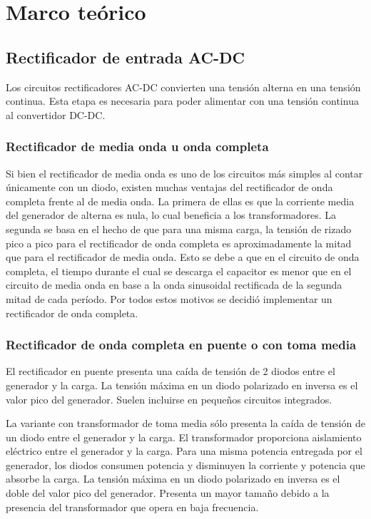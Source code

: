 \section{Marco teórico}




\subsection{Rectificador de entrada AC-DC}

Los circuitos rectificadores AC-DC convierten una tensión alterna en una tensión continua.
Esta etapa es necesaria para poder alimentar con una tensión continua al convertidor DC-DC. \cite{hart_espanol}

\subsubsection{Rectificador de media onda u onda completa}

Si bien el rectificador de media onda es uno de los circuitos más simples al contar únicamente con un diodo,
existen muchas ventajas del rectificador de onda completa frente al de media onda.
La primera de ellas es que la corriente media del generador de alterna es nula, lo cual beneficia a los transformadores. 
La segunda se basa en el hecho de que para una misma carga,
la tensión de rizado pico a pico para el rectificador de onda completa es
aproximadamente la mitad que para el rectificador de media onda. 
Esto se debe a que en el circuito de onda completa,
el tiempo durante el cual se descarga el capacitor es menor que en el circuito de media onda %
en base a la onda sinusoidal rectificada de la segunda mitad de cada período. 
Por todos estos motivos se decidió implementar un rectificador de onda completa.

\subsubsection{Rectificador de onda completa en puente o con toma media}

El rectificador en puente presenta una caída de tensión de 2 diodos entre el generador y la carga. 
La tensión máxima en un diodo polarizado en inversa es el valor pico del generador.
Suelen incluirse en pequeños circuitos integrados. 

La variante con transformador de toma media sólo presenta la caída de tensión de un diodo entre el generador y la carga.
El transformador proporciona aislamiento eléctrico entre el generador y la carga. 
Para una misma potencia entregada por el generador,
los diodos consumen potencia y disminuyen la corriente y potencia que absorbe la carga. 
La tensión máxima en un diodo polarizado en inversa es el doble del valor pico del generador. 
Presenta un mayor tamaño debido a la presencia del transformador que opera en baja frecuencia. 

